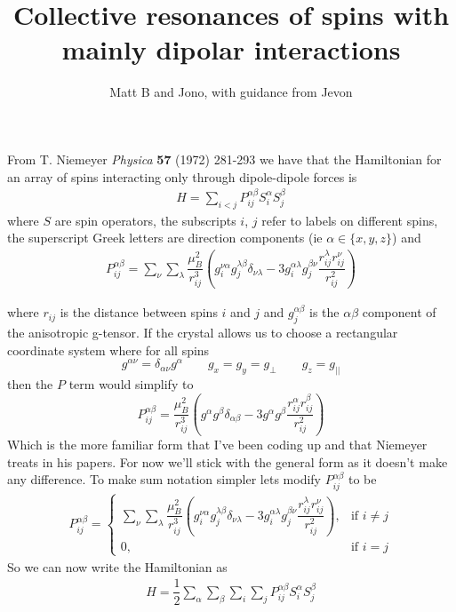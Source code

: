 \documentclass{article}
\begin{document}
\title{Collective resonances of spins with mainly dipolar interactions}

\author{Matt B and Jono, with guidance from Jevon}

\maketitle


From T. Niemeyer \emph{Physica} {\bf 57} (1972) 281-293 we have that the Hamiltonian for an array of spins interacting only through dipole-dipole forces is
\begin{align}
 H= \sum_{i<j}P^{\alpha\beta}_{ij} S^\alpha_i S^\beta_j
\end{align}
where $S$ are spin operators, the subscripts $i$, $j$ refer to labels on different spins, the superscript Greek letters are direction components (ie $\alpha \in \{x,y,z\}$) and 
\begin{align}
P_{ij}^{\alpha\beta}=
\sum_\nu\sum_\lambda\dfrac{\mu^2_B}{r^3_{ij}}\left(g_i^{\nu\alpha}g_j^{\lambda\beta}\delta_{\nu\lambda}-3g_i^{\alpha\lambda}g_j^{\beta\nu}\dfrac{r_{ij}^\lambda r_{ij}^\nu}{r_{ij}^2}\right)
\end{align}

where $r_{ij}$ is the distance between spins $i$ and $j$ and $g_j^{\alpha\beta}$ is the $\alpha\beta$ component of the anisotropic g-tensor. If the crystal allows us to choose a rectangular coordinate system where for all spins
$$ g^{\alpha\nu}=\delta_{\alpha\nu}g^\alpha \qquad g_x=g_y=g_\perp \qquad g_z=g_{||}$$ then the $P$ term would simplify to 
$$P_{ij}^{\alpha\beta}=\dfrac{\mu^2_B}{r^3_{ij}}\left(g^{\alpha}g^{\beta}\delta_{\alpha\beta}-3g^{\alpha}g^{\beta}\dfrac{r_{ij}^\alpha r_{ij}^\beta}{r_{ij}^2}\right)$$
Which is the more familiar form that I've been coding up and that Niemeyer treats in his papers. For now we'll stick with the general form as it doesn't make any difference. To make sum notation simpler lets modify $P^{\alpha\beta}_{ij}$ to be
\begin{align}
P_{ij}^{\alpha\beta}=\begin{cases}
\sum_\nu\sum_\lambda\dfrac{\mu^2_B}{r^3_{ij}}\left(g_i^{\nu\alpha}g_j^{\lambda\beta}\delta_{\nu\lambda}-3g_i^{\alpha\lambda}g_j^{\beta\nu}\dfrac{r_{ij}^\lambda r_{ij}^\nu}{r_{ij}^2}\right), & \text{if }i\neq j\\
0, & \text{if }i=j
\end{cases}
\end{align}
So we can now write the Hamiltonian as
\begin{align}
H=\dfrac{1}{2}\sum_\alpha\sum_\beta\sum_i\sum_j P_{ij}^{\alpha\beta} S_i^\alpha S_j^\beta
\end{align}
\end{document}
